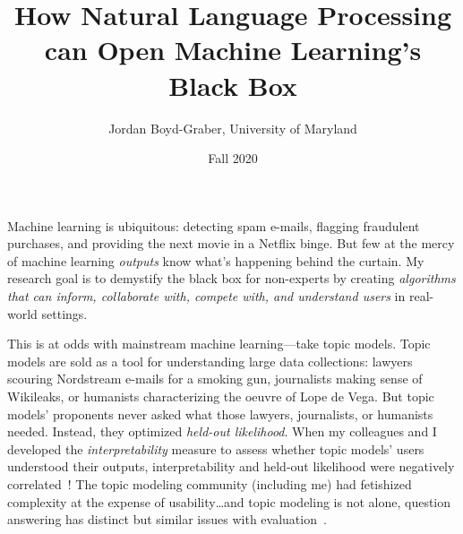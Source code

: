 \usepackage{graphicx}
\usepackage{amssymb}
\usepackage{colortbl}
\usepackage{epstopdf}
\usepackage{url}


\usepackage[top=1in, bottom=1in, left=1in, right=1in]{geometry}

\newcommand{\student}[1]{\vspace{.5cm}\fbox{\parbox{0.95\linewidth}{{\small
        #1}}}\vspace{.5cm}}
\providecommand{\blue}[1]{{\color{blue}{#1}}}
\providecommand{\red}[1]{{\color{red}{#1}}}
\providecommand{\green}[1]{{\color{green}{#1}}}



 \title{How Natural Language Processing can Open Machine Learning's Black Box}

 \author{Jordan Boyd-Graber, University of Maryland}


\date{Fall 2020}

\maketitle

Machine learning is ubiquitous: detecting spam e-mails, flagging fraudulent
purchases, and providing the next movie in a Netflix binge.  But few at
the mercy of machine learning \emph{outputs} know what's happening behind the
curtain.  My research goal is to demystify the black box for non-experts by
creating \emph{algorithms that can inform, collaborate with, compete with, and
  understand users} in real-world settings.

This is at odds with mainstream machine learning---take topic models.  Topic
models are sold as a tool for understanding large data collections: lawyers
scouring Nordstream e-mails for a smoking gun, journalists making sense of Wikileaks,
or humanists characterizing the oeuvre of Lope de Vega.  But topic models'
proponents never asked what those lawyers, journalists, or humanists
needed. Instead, they optimized \emph{held-out likelihood}. When my colleagues
and I developed the \emph{interpretability} measure to assess whether topic
models' users understood their outputs, interpretability and
held-out likelihood were negatively correlated~\cite{chang-09b}! The topic
modeling community (including me) had fetishized complexity at the expense of
usability\dots and topic modeling is not alone, question answering has distinct but similar issues with evaluation~\cite{boyd-graber-20}.

